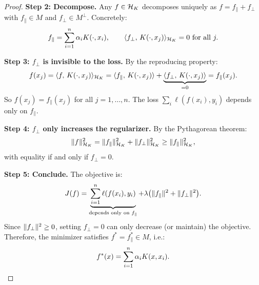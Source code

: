 \begin{notechapter}
\begin{proof}
\textbf{Step 2: Decompose.} Any $f \in \mathcal{H}_K$ decomposes uniquely as $f =
f_\parallel + f_\perp$ with $f_\parallel \in M$ and $f_\perp \in
M^\perp$. Concretely:
\[
f_\parallel = \sum_{i=1}^n \alpha_i K(\cdot, x_i), \qquad
\langle f_\perp,\, K(\cdot, x_j) \rangle_{\mathcal{H}_K} = 0 \text{ for all } j.
\]

\textbf{Step 3: $f_\perp$ is invisible to the loss.} By the reproducing
property:
\[
f(x_j) = \langle f,\, K(\cdot, x_j) \rangle_{\mathcal{H}_K} = \langle f_\parallel,\, K(\cdot,
x_j) \rangle + \underbrace{\langle f_\perp,\, K(\cdot, x_j) \rangle}_{= 0} =
f_\parallel(x_j).
\]
So $f(x_j) = f_\parallel(x_j)$ for all $j = 1, \ldots, n$. The loss
$\sum_i \ell(f(x_i), y_i)$ depends only on $f_\parallel$.

\textbf{Step 4: $f_\perp$ only increases the regularizer.} By the
Pythagorean theorem:
\[
\| f \|_{\mathcal{H}_K}^2 = \| f_\parallel \|_{\mathcal{H}_K}^2 + \| f_\perp \|_{\mathcal{H}_K}^2
\geq \| f_\parallel \|_{\mathcal{H}_K}^2,
\]
with equality if and only if $f_\perp = 0$.

\textbf{Step 5: Conclude.} The objective is:
\[
J(f) = \underbrace{\sum_{i=1}^n \ell(f(x_i), y_i)}_{\text{depends only
on } f_\parallel} + \lambda\bigl(\| f_\parallel \|^2 +
\| f_\perp \|^2\bigr).
\]
Since $\| f_\perp \|^2 \geq 0$, setting $f_\perp = 0$ can only decrease
(or maintain) the objective. Therefore, the minimizer satisfies $f^* =
f_\parallel^* \in M$, i.e.:
\[
f^*(x) = \sum_{i=1}^n \alpha_i K(x, x_i). \qedhere
\]
\end{proof}

\begin{figure}[ht]
\centering
{}
\end{figure}
\end{notechapter}
